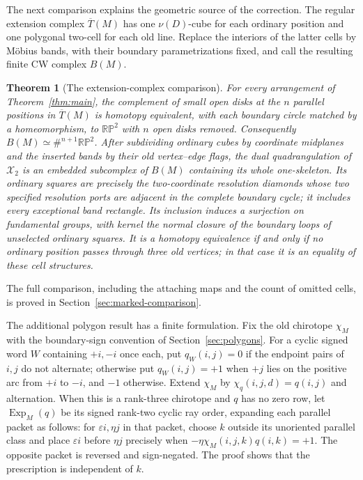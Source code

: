 \documentclass[11pt]{article}
\newtheorem{theorem}{Theorem}[section]
\theoremstyle{definition}\newtheorem{definition}[theorem]{Definition}
\newcommand{\RP}{\mathbb{RP}}
\begin{document}
The next comparison explains the geometric source of the correction.
The regular extension complex $\overline T(M)$ has one
$\nu(D)$-cube for each ordinary position and one polygonal two-cell
for each old line. Replace the interiors of the latter cells by
M\"obius bands, with their boundary parametrizations fixed, and call
the resulting finite CW complex $B(M)$.
\begin{theorem}[The extension-complex comparison]\label{thm:comparison}
For every arrangement of Theorem~\ref{thm:main}, the complement of
small open disks at the $n$ parallel positions in $\overline T(M)$
is homotopy equivalent, with each boundary circle matched by a
homeomorphism, to $\RP^2$ with $n$ open disks removed. Consequently
$B(M)\simeq\#^{n+1}\RP^2$.
After subdividing ordinary cubes by coordinate midplanes and the
inserted bands by their old vertex--edge flags, the dual
quadrangulation of $\mathcal X_2$ is an embedded subcomplex of $B(M)$
containing its whole one-skeleton. Its ordinary squares are precisely
the two-coordinate resolution diamonds whose two specified resolution
ports are adjacent in the complete boundary cycle; it includes every
exceptional band rectangle. Its inclusion induces a surjection on
fundamental groups, with kernel the normal closure of the boundary
loops of unselected ordinary squares. It is a homotopy equivalence
if and only if no ordinary position passes through three old vertices;
in that case it is an equality of these cell structures.
\end{theorem}
The full comparison, including the attaching maps and the count of
omitted cells, is proved in Section~\ref{sec:marked-comparison}.

The additional polygon result has a finite formulation. Fix the old
chirotope $\chi_M$ with the boundary-sign convention of
Section~\ref{sec:polygons}. For a cyclic signed word $W$ containing
$+i,-i$ once each, put $q_W(i,j)=0$ if the endpoint pairs of $i,j$
do not alternate; otherwise put $q_W(i,j)=+1$ when $+j$ lies on the
positive arc from $+i$ to $-i$, and $-1$ otherwise.
Extend $\chi_M$ by $\chi_q(i,j,d)=q(i,j)$ and alternation.
When this is a rank-three chirotope and $q$ has no zero row, let
$\operatorname{Exp}_M(q)$ be its signed rank-two cyclic ray order,
expanding each parallel packet as follows: for $\varepsilon i,\eta j$
in that packet, choose $k$ outside its unoriented parallel class and
place $\varepsilon i$ before $\eta j$ precisely when
$-\eta\chi_M(i,j,k)q(i,k)=+1$. The opposite packet is reversed
and sign-negated. The proof shows that the prescription is independent
of $k$.
\end{document}

